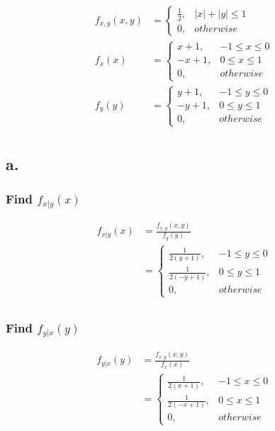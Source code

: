 \documentclass[12pt]{article}
\begin{document}
\begin{align*}
  f_{x,y}(x,y) &=
  \begin{cases}
    \frac{1}{2}, & |x| + |y| \leq 1 \\
    0, & otherwise
  \end{cases} \\
  f_{x}(x) &=
  \begin{cases}
    x+1, & -1\leq x \leq 0 \\
    -x+1, & 0\leq x \leq 1 \\
    0, & otherwise
  \end{cases} \\
  f_{y}(y) &=
  \begin{cases}
    y+1, & -1\leq y \leq 0 \\
    -y+1, & 0\leq y \leq 1 \\
    0, & otherwise
  \end{cases} \\
\end{align*}
\subsection*{a.}
\subsubsection*{Find $f_{x|y}(x)$}
\begin{align*}
  f_{x|y}(x) &= \frac{f_{x,y}(x,y)}{f_y(y)} \\
  &= \begin{cases}
    \frac{1}{2(y+1)}, & -1 \leq y \leq 0 \\
    \frac{1}{2(-y+1)}, & 0 \leq y \leq 1 \\
    0, & otherwise
  \end{cases} \\
\end{align*} 

\subsubsection*{Find $f_{y|x}(y)$}
\begin{align*}
  f_{y|x}(y) &= \frac{f_{x,y}(x,y)}{f_x(x)} \\
  &= \begin{cases}
    \frac{1}{2(x+1)}, & -1 \leq x \leq 0 \\
    \frac{1}{2(-x+1)}, & 0 \leq x \leq 1 \\
    0, & otherwise
  \end{cases} \\
\end{align*} 
\end{document}
